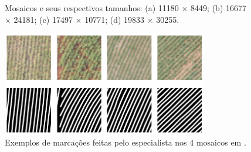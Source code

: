 \documentclass[12pt, a4paper, english, brazil]{article}
\begin{document}
\begin{figure}[htbp]
    \centering
    \caption{Mosaicos e seus respectivos tamanhos: (a) 11180 $\times$ 8449; (b) 16677 $\times$ 24181; (c) 17497 $\times$ 10771; (d) 19833 $\times$ 30255.}
    \label{fig:mosaicos1}
\end{figure}

\begin{figure}[htbp]
    \centering
    \includegraphics[width=0.8\textwidth]{img/linhas2.jpg}
    \caption{Exemplos de marcações feitas pelo especialista nos 4 mosaicos em .}
    \label{fig:linhas}
\end{figure}
\end{document}
